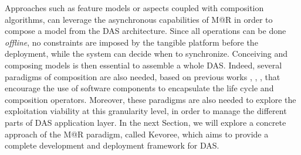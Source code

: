 Approaches such as feature models or aspects \cite{morin2009taming} coupled with composition algorithms, can leverage the asynchronous capabilities of M@R in order to compose a model from the DAS architecture.
Since all operations can be done \textit{offline}, no constraints are imposed by the tangible platform before the deployment, while the system can decide when to synchronize.
Conceiving and composing models is then essential to assemble a whole DAS.
Indeed, several paradigms of composition are also needed, based on previous works \cite{morin2009mar}, \cite{ko2012low}, \cite{rouvoy2009music}, that encourage the use of software components to encapsulate the life cycle and composition operators.
Moreover, these paradigms are also needed to explore the exploitation viability at this granularity level, in order to manage the different parts of DAS application layer. 
In the next Section, we will explore a concrete approach of the M@R paradigm, called Kevoree, which aims to provide a complete development and deployment framework for DAS.


